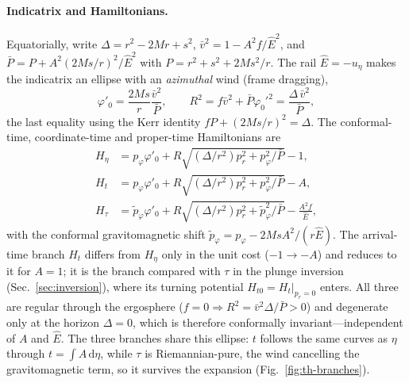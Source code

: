 \documentclass[12pt]{iopart}
\newcommand{\Ehat}{\hat E}
\newcommand{\dd}{\mathrm{d}}
\begin{document}
\paragraph{Indicatrix and Hamiltonians.} Equatorially, write
$\Delta=r^2-2Mr+s^2$, $\bar v^2=1-A^2f/\Ehat^2$, and
$\bar P=P+A^2(2Ms/r)^2/\Ehat^2$ with $P=r^2+s^2+2Ms^2/r$. The rail
$\Ehat=-u_\eta$ makes the indicatrix an ellipse with an \emph{azimuthal} wind
(frame dragging),
\begin{equation}
    \varphi'_0=\frac{2Ms}{r}\frac{\bar v^2}{\bar P},\qquad
    R^2=f\bar v^2+\bar P\varphi_0'^2=\frac{\Delta\,\bar v^2}{\bar P},
    \label{eq:tk-ind}
\end{equation}
the last equality using the Kerr identity $fP+(2Ms/r)^2=\Delta$. The
conformal-time, coordinate-time and proper-time Hamiltonians are
\begin{align}
    H_\eta&=p_\varphi\varphi'_0
        +R\sqrt{(\Delta/r^2)p_r^2+p_\varphi^2/\bar P}-1,
    \label{eq:Heta}\\
    H_t&=p_\varphi\varphi'_0
        +R\sqrt{(\Delta/r^2)p_r^2+p_\varphi^2/\bar P}-A,
    \label{eq:Ht-tk}\\
    H_\tau&=\tilde p_\varphi\varphi'_0
        +R\sqrt{(\Delta/r^2)p_r^2+\tilde p_\varphi^2/\bar P}-\frac{A^2 f}{\Ehat},
    \label{eq:Htau-tk}
\end{align}
with the conformal gravitomagnetic shift
$\tilde p_\varphi=p_\varphi-2MsA^2/(r\Ehat)$. The arrival-time branch $H_t$ differs
from $H_\eta$ only in the unit cost ($-1\to-A$) and reduces to it for $A=1$; it is
the branch compared with $\tau$ in the plunge inversion
(Sec.~\ref{sec:inversion}), where its turning potential
$H_{t0}=H_t|_{p_r=0}$ enters. All three are regular through the
ergosphere ($f=0\Rightarrow R^2=\bar v^2\Delta/\bar P>0$) and degenerate only at
the horizon $\Delta=0$, which is therefore conformally invariant---independent of
$A$ and $\Ehat$. The three branches share this ellipse: $t$ follows the same
curves as $\eta$ through $t=\int A\,\dd\eta$, while $\tau$ is Riemannian-pure, the
wind cancelling the gravitomagnetic term, so it survives the expansion
(Fig.~\ref{fig:th-branches}).
\end{document}
